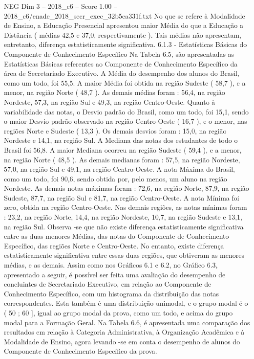 \begin{textsample}{NEG Dim 3 – 2018\_c6 – Score 1.00 – 2018\_c6/enade\_2018\_secr\_exec\_32b5ea331f.txt}
No que se refere à Modalidade de Ensino, a Educação Presencial apresentou maior Média do que a Educação a Distância ( médias 42,5 e 37,0, respectivamente ).
Tais médias não apresentam, entretanto, diferença estatisticamente significativa. 6.1.3 - Estatísticas Básicas do Componente de Conhecimento Específico Na Tabela 6.5, são apresentadas as Estatísticas Básicas referentes ao Componente de Conhecimento Específico da área de Secretariado Executivo.
A Média do desempenho dos alunos do Brasil, como um todo, foi 55,5.
A maior Média foi obtida na região Sudeste ( 58,7 ), e a menor, na região Norte ( 48,7 ).
As demais médias foram : 56,4, na região Nordeste, 57,3, na região Sul e 49,3, na região Centro-Oeste.
Quanto à variabilidade das notas, o Desvio padrão do Brasil, como um todo, foi 15,1, sendo o maior Desvio padrão observado na região Centro-Oeste ( 16,7 ), e o menor, nas regiões Norte e Sudeste ( 13,3 ).
Os demais desvios foram : 15,0, na região Nordeste e 14,1, na região Sul.
A Mediana das notas dos estudantes de todo o Brasil foi 56,8.
A maior Mediana ocorreu na região Sudeste ( 59,4 ), e a menor, na região Norte ( 48,5 ).
As demais medianas foram : 57,5, na região Nordeste, 57,0, na região Sul e 49,1, na região Centro-Oeste.
A nota Máxima do Brasil, como um todo, foi 90,6, sendo obtida por, pelo menos, um aluno na região Nordeste.
As demais notas máximas foram : 72,6, na região Norte, 87,9, na região Sudeste, 87,7, na região Sul e 81,7, na região Centro-Oeste.
A nota Mínima foi zero, obtida na região Centro-Oeste.
Nas demais regiões, as notas mínimas foram : 23,2, na região Norte, 14,4, na região Nordeste, 10,7, na região Sudeste e 13,1, na região Sul.
Observa -se que não existe diferença estatisticamente significativa entre as duas menores Médias, das notas do Componente de Conhecimento Específico, das regiões Norte e Centro-Oeste.
No entanto, existe diferença estatisticamente significativa entre essas duas regiões, que obtiveram as menores médias, e as demais.
Assim como nos Gráficos 6.1 e 6.2, no Gráfico 6.3, apresentado a seguir, é possível ser feita uma avaliação do desempenho de concluintes de Secretariado Executivo, em relação ao Componente de Conhecimento Específico, com um histograma da distribuição das notas correspondentes.
Esta também é uma distribuição unimodal, e o grupo modal é o ( 50 ; 60 ], igual ao grupo modal da prova, como um todo, e acima do grupo modal para a Formação Geral.
Na Tabela 6.6, é apresentada uma comparação dos resultados em relação à Categoria Administrativa, à Organização Acadêmica e à Modalidade de Ensino, agora levando -se em conta o desempenho de alunos do Componente de Conhecimento Específico da prova.

\end{textsample}
